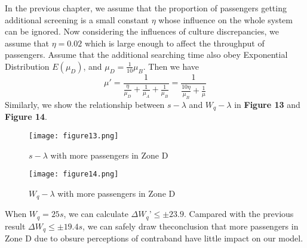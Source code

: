 \documentclass{mcmthesis}
\begin{document}
	In the previous chapter, we assume that the proportion of passengers getting additional screening is a small constant $\eta$ whose influence on the whole system can be ignored. Now considering the influences of culture discrepancies, we assume that $\eta=0.02$ which is large enough to affect the throughput of passengers. Assume that the additional searching time also obey Exponential Distribution $E(\mu_D)$, and $\mu_D=\frac{1}{10}\mu_B$.
	Then we have
	$$\mu'=\frac{1}{\frac{\eta}{\mu_D}+\frac{1}{\mu_A}+\frac{1}{\mu_B}}=\frac{1}{\frac{10\eta}{\mu_B}+\frac{1}{\mu}}$$
	Similarly, we show the relationship between $s-\lambda$ and $W_q-\lambda$ in \textbf{Figure 13} and \textbf{Figure 14}.
	\begin{figure}[H]
		\small
		\centering
		\texttt{[image: figure13.png]}
		\caption{$s-\lambda$ with more passengers in Zone D} \label{fig:13}
	\end{figure}
	\begin{figure}[H]
		\small
		\centering
		\texttt{[image: figure14.png]}
		\caption{$W_q-\lambda$ with more passengers in Zone D} \label{fig:14}
	\end{figure}
	When $W_q=25s$, we can calculate $\Delta W_q’\leq\pm23.9$. Campared with the previous result $\Delta W_q\leq \pm 19.4s$, we can safely draw theconclusion that more passengers in Zone D due to obsure perceptions of contraband have little impact on our model.
\end{document}
